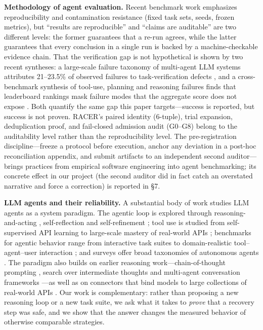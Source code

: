 \documentclass[review]{fcs}
\begin{document}
\textbf{Methodology of agent evaluation.} Recent benchmark work emphasizes reproducibility and contamination resistance (fixed task sets, seeds, frozen metrics), but ``results are reproducible'' and ``claims are auditable'' are two different levels: the former guarantees that a re-run agrees, while the latter guarantees that every conclusion in a single run is backed by a machine-checkable evidence chain. That the verification gap is not hypothetical is shown by two recent syntheses: a large-scale failure taxonomy of multi-agent LLM systems attributes 21--23.5\% of observed failures to task-verification defects \cite{ref14}, and a cross-benchmark synthesis of tool-use, planning and reasoning failures finds that leaderboard rankings mask failure modes that the aggregate score does not expose \cite{ref15}. Both quantify the same gap this paper targets---success is reported, but success is not proven. RACER's paired identity (6-tuple), trial expansion, deduplication proof, and fail-closed admission audit (G0--G8) belong to the auditability level rather than the reproducibility level. The pre-registration discipline---freeze a protocol before execution, anchor any deviation in a post-hoc reconciliation appendix, and submit artifacts to an independent second auditor---brings practices from empirical software engineering \cite{ref16,ref17} into agent benchmarking; its concrete effect in our project (the second auditor did in fact catch an overstated narrative and force a correction) is reported in \S7.

\textbf{LLM agents and their reliability.} A substantial body of work studies LLM agents as a system paradigm. The agentic loop is explored through reasoning-and-acting \cite{ref18}, self-reflection \cite{ref19} and self-refinement \cite{ref20}; tool use is studied from self-supervised API learning \cite{ref21} to large-scale mastery of real-world APIs \cite{ref22}; benchmarks for agentic behavior range from interactive task suites \cite{ref23,ref24,ref25,ref26} to domain-realistic tool--agent--user interaction \cite{ref6}; and surveys offer broad taxonomies of autonomous agents \cite{ref27,ref28,ref29}. The paradigm also builds on earlier reasoning work---chain-of-thought prompting \cite{ref30}, search over intermediate thoughts \cite{ref31} and multi-agent conversation frameworks \cite{ref32}---as well as on connectors that bind models to large collections of real-world APIs \cite{ref33}. Our work is complementary: rather than proposing a new reasoning loop or a new task suite, we ask what it takes to \emph{prove} that a recovery step was safe, and we show that the answer changes the measured behavior of otherwise comparable strategies.
\end{document}
